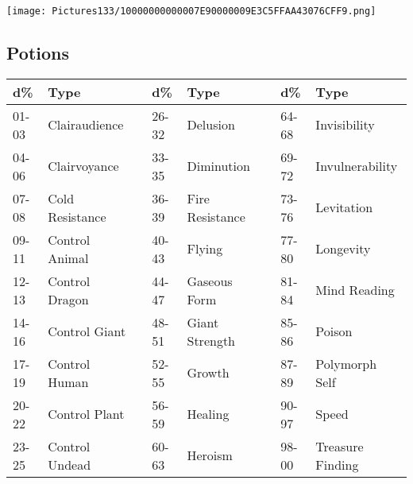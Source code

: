 \documentclass[a4paper,twoside,openany,10pt]{book}
\begin{document}
\vfill

 \texttt{[image: Pictures133/10000000000007E90000009E3C5FFAA43076CFF9.png]}  

\pagebreak

\subsection{Potions}\label{potions}

\begin{tabular*}{1\linewidth}{@{\extracolsep{\fill}}llllllll}
\textbf{d\%} & \textbf{Type} & & \textbf{d\%} & \textbf{Type} & & \textbf{d\%} & \textbf{Type} \\\toprule
01-03 & Clairaudience & & 26-32 & Delusion & & 64-68 & Invisibility \\\hline
04-06 & Clairvoyance & & 33-35 & Diminution & & 69-72 &
Invulnerability \\\hline
07-08 & Cold Resistance & & 36-39 & Fire Resistance & & 73-76 &
Levitation \\\hline
09-11 & Control Animal & & 40-43 & Flying & & 77-80 & Longevity \\\hline
12-13 & Control Dragon & & 44-47 & Gaseous Form & & 81-84 & Mind
Reading \\\hline
14-16 & Control Giant & & 48-51 & Giant Strength & & 85-86 & Poison \\\hline
17-19 & Control Human & & 52-55 & Growth & & 87-89 & Polymorph Self \\\hline
20-22 & Control Plant & & 56-59 & Healing & & 90-97 & Speed \\\hline
23-25 & Control Undead & & 60-63 & Heroism & & 98-00 & Treasure
Finding \\\bottomrule
\end{tabular*}
\end{document}
